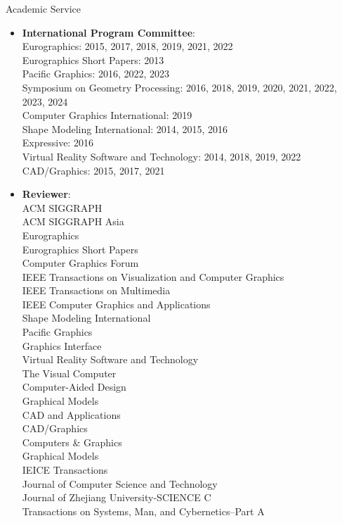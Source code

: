 {\Large\sc Academic Service}
\vspace{-3mm}
\begin{itemize}
\item {\bf International Program Committee}:\\
Eurographics: 2015, 2017, 2018, 2019, 2021, 2022\\
Eurographics Short Papers: 2013\\
Pacific Graphics: 2016, 2022, 2023\\
Symposium on Geometry Processing: 2016, 2018, 2019, 2020, 2021, 2022, 2023, 2024\\
Computer Graphics International: 2019\\
Shape Modeling International: 2014, 2015, 2016\\
Expressive: 2016\\
Virtual Reality Software and Technology: 2014, 2018, 2019, 2022\\
CAD/Graphics: 2015, 2017, 2021\\

\item {\bf Reviewer}:\\
ACM SIGGRAPH\\
ACM SIGGRAPH Asia\\
Eurographics\\
Eurographics Short Papers\\
Computer Graphics Forum\\
IEEE Transactions on Visualization and Computer Graphics\\
IEEE Transactions on Multimedia\\
IEEE Computer Graphics and Applications\\
Shape Modeling International\\
Pacific Graphics\\
Graphics Interface\\
Virtual Reality Software and Technology\\
The Visual Computer\\
Computer-Aided Design\\
Graphical Models\\
CAD and Applications\\
CAD/Graphics\\
Computers \& Graphics\\
Graphical Models\\
IEICE Transactions\\
Journal of Computer Science and Technology\\
Journal of Zhejiang University-SCIENCE C\\
Transactions on Systems, Man, and Cybernetics--Part A
\end{itemize}
